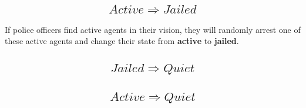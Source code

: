 \documentclass[UTF8,11pt]{article}
\begin{document}
        \subsection{\[Active \Rightarrow Jailed\]}
            If police officers find active agents in their vision, they will
            randomly arrest one of these active agents and change their state from
            \textbf{active} to \textbf{jailed}.
        \subsection{\[Jailed \Rightarrow Quiet\]}
        \subsection{\[Active \Rightarrow Quiet\]}


    
\end{document}
